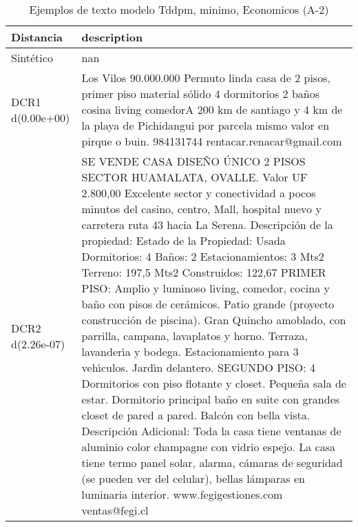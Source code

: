\begin{table}[H]
\centering
\fontsize{10}{14}\selectfont
\caption{Ejemplos de texto modelo Tddpm, minimo, Economicos (A-2)}
\label{table-example-economicos-a-2-tddpm_mlp-min-text}
\begin{tabular}{|l|m{35em}|}
\hline
\rowcolor[gray]{0.8}
Distancia & description \\
\hline Sintético & nan \\
\hline DCR1 d(0.00e+00) & Los Vilos 90.000.000 Permuto linda casa de 2 pisos, primer piso material s\'olido 4 dormitorios 2 ba\~nos cosina living comedorA 200 km de santiago y 4 km de la playa de Pichidangui por parcela mismo valor en pirque o buin.  984131744 rentacar.renacar@gmail.com \\
\hline DCR2 d(2.26e-07) & SE VENDE CASA DISE\~NO \'UNICO 2 PISOS SECTOR HUAMALATA, OVALLE. Valor UF 2.800,00 Excelente sector y conectividad a pocos minutos del casino, centro, Mall, hospital nuevo y carretera ruta 43 hacia La Serena. Descripci\'on de la propiedad: Estado de la Propiedad: Usada Dormitorios: 4 Ba\~nos: 2 Estacionamientos: 3 Mts2 Terreno: 197,5 Mts2 Construidos: 122,67 PRIMER PISO: Amplio y luminoso living, comedor, cocina y ba\~no con pisos de cer\'amicos. Patio grande (proyecto construcci\'on de piscina). Gran Quincho amoblado, con parrilla, campana, lavaplatos y horno. Terraza, lavander{\'\i}a y bodega. Estacionamiento para 3 veh{\'\i}culos. Jard{\'\i}n delantero. SEGUNDO PISO: 4 Dormitorios con piso flotante y closet. Peque\~na sala de estar. Dormitorio principal ba\~no en suite con grandes closet de pared a pared. Balc\'on con bella vista. Descripci\'on Adicional: Toda la casa tiene ventanas de aluminio color champagne con vidrio espejo. La casa tiene termo panel solar, alarma, c\'amaras de seguridad (se pueden ver del celular), bellas l\'amparas en luminaria interior.   www.fegigestiones.com ventas@fegi.cl \\
\hline
\end{tabular}
\end{table}
